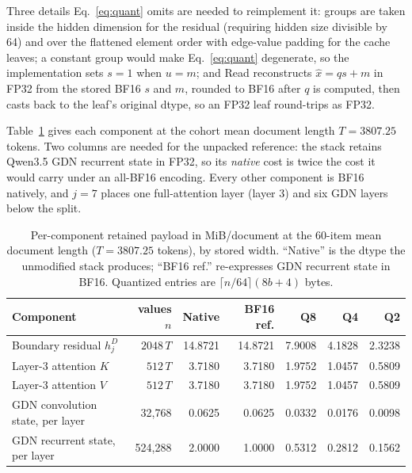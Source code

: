 \documentclass{article}
\begin{document}
Three details Eq.~\ref{eq:quant} omits are needed to reimplement it: groups are
taken inside the hidden dimension for the residual (requiring hidden size
divisible by 64) and over the flattened element order with edge-value padding for
the cache leaves; a constant group would make Eq.~\ref{eq:quant} degenerate, so
the implementation sets $s=1$ when $u=m$; and Read reconstructs $\hat x=qs+m$ in
FP32 from the stored BF16 $s$ and $m$, rounded to BF16 after $q$ is computed, then
casts back to the leaf's original dtype, so an FP32 leaf round-trips as FP32.

Table~\ref{tab:store-components} gives each component at the cohort mean
document length $T=3807.25$ tokens.  Two columns are needed for the unpacked
reference: the stack retains Qwen3.5 GDN recurrent state in FP32, so its
\emph{native} cost is twice the cost it would carry under an all-BF16 encoding.
Every other component is BF16 natively, and $j=7$ places one full-attention
layer (layer 3) and six GDN layers below the split.

\begin{table}[H]
  \caption{Per-component retained payload in MiB/document at the 60-item mean
document length ($T=3807.25$ tokens), by stored width.  ``Native'' is the dtype
the unmodified stack produces; ``BF16 ref.'' re-expresses GDN recurrent state
in BF16.  Quantized entries are $\lceil n/64\rceil(8b+4)$ bytes.}
  \label{tab:store-components}
  \centering\small
  \begin{tabular}{@{}lrrrrrr@{}}
    \toprule
    Component & values $n$ & Native & BF16 ref. & Q8 & Q4 & Q2 \\
    \midrule
    Boundary residual $h_j^D$ & $2048\,T$ & 14.8721 & 14.8721 & 7.9008 & 4.1828 & 2.3238 \\
    Layer-3 attention $K$ & $512\,T$ & 3.7180 & 3.7180 & 1.9752 & 1.0457 & 0.5809 \\
    Layer-3 attention $V$ & $512\,T$ & 3.7180 & 3.7180 & 1.9752 & 1.0457 & 0.5809 \\
    GDN convolution state, per layer & 32{,}768 & 0.0625 & 0.0625 & 0.0332 & 0.0176 & 0.0098 \\
    GDN recurrent state, per layer & 524{,}288 & 2.0000 & 1.0000 & 0.5312 & 0.2812 & 0.1562 \\
    \bottomrule
  \end{tabular}
\end{table}


\end{document}
